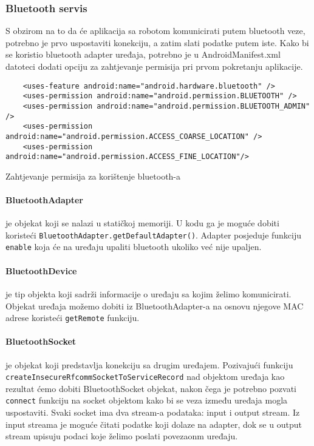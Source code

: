 \documentclass[../Document.tex]{subfiles}
\begin{document}
\subsubsection{Bluetooth servis}
S obzirom na to da će aplikacija sa robotom komunicirati putem bluetooth veze, potrebno je prvo uspostaviti konekciju, a zatim slati podatke putem iste. Kako bi se koristio bluetooth adapter uređaja, potrebno je u AndroidManifest.xml datoteci dodati opciju za zahtjevanje permisija pri prvom pokretanju aplikacije.

\begin{code}
    \begin{verbatim}
    <uses-feature android:name="android.hardware.bluetooth" />
    <uses-permission android:name="android.permission.BLUETOOTH" />
    <uses-permission android:name="android.permission.BLUETOOTH_ADMIN" />
    <uses-permission android:name="android.permission.ACCESS_COARSE_LOCATION" />
    <uses-permission android:name="android.permission.ACCESS_FINE_LOCATION"/>
    \end{verbatim}
    \caption{Zahtjevanje permisija za korištenje bluetooth-a}
\end{code}

\paragraph{BluetoothAdapter} je objekat koji se nalazi u statičkoj memoriji. U kodu ga je moguće dobiti koristeći \verb|BluetoothAdapter.getDefaultAdapter()|. Adapter posjeduje funkciju \verb|enable| koja će na uređaju upaliti bluetooth ukoliko već nije upaljen.

\paragraph{BluetoothDevice} \label{btdev}je tip objekta koji sadrži informacije o uređaju sa kojim želimo komunicirati. Objekat uređaja možemo dobiti iz BluetoothAdapter-a na osnovu njegove MAC adrese koristeći \verb|getRemote| funkciju.

\paragraph{BluetoothSocket} je objekat koji predstavlja konekciju sa drugim uređajem. Pozivajući funkciju \verb|createInsecureRfcommSocketToServiceRecord| nad objektom uređaja kao rezultat ćemo dobiti BluetoothSocket objekat, nakon čega je potrebno pozvati \verb|connect| funkciju na socket objektom kako bi se veza između uređaja mogla uspostaviti. Svaki socket ima dva stream-a podataka: input i output stream. Iz input streama je moguće čitati podatke koji dolaze na adapter, dok se u output stream upisuju podaci koje želimo poslati povezaonm uređaju.
\end{document}
